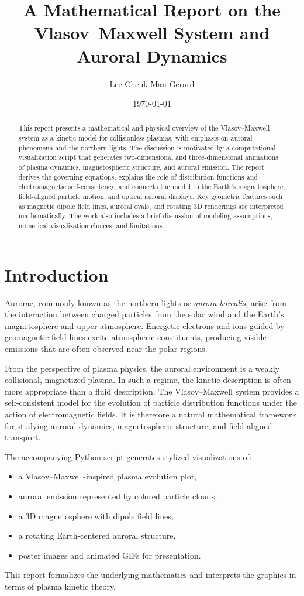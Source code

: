 \documentclass[11pt]{article}
\title{\textbf{A Mathematical Report on the Vlasov--Maxwell System and Auroral Dynamics}}
\author{Lee Cheuk Man Gerard}
\date{\today}
\begin{document}
\maketitle

\begin{abstract}
This report presents a mathematical and physical overview of the Vlasov--Maxwell system as a kinetic model for collisionless plasmas, with emphasis on auroral phenomena and the northern lights. The discussion is motivated by a computational visualization script that generates two-dimensional and three-dimensional animations of plasma dynamics, magnetospheric structure, and auroral emission. The report derives the governing equations, explains the role of distribution functions and electromagnetic self-consistency, and connects the model to the Earth's magnetosphere, field-aligned particle motion, and optical auroral displays. Key geometric features such as magnetic dipole field lines, auroral ovals, and rotating 3D renderings are interpreted mathematically. The work also includes a brief discussion of modeling assumptions, numerical visualization choices, and limitations.
\end{abstract}

\tableofcontents
\newpage

\section{Introduction}
Aurorae, commonly known as the northern lights or \emph{aurora borealis}, arise from the interaction between charged particles from the solar wind and the Earth's magnetosphere and upper atmosphere. Energetic electrons and ions guided by geomagnetic field lines excite atmospheric constituents, producing visible emissions that are often observed near the polar regions.

From the perspective of plasma physics, the auroral environment is a weakly collisional, magnetized plasma. In such a regime, the kinetic description is often more appropriate than a fluid description. The Vlasov--Maxwell system provides a self-consistent model for the evolution of particle distribution functions under the action of electromagnetic fields. It is therefore a natural mathematical framework for studying auroral dynamics, magnetospheric structure, and field-aligned transport.

The accompanying Python script generates stylized visualizations of:
\begin{itemize}
    \item a Vlasov--Maxwell-inspired plasma evolution plot,
    \item auroral emission represented by colored particle clouds,
    \item a 3D magnetosphere with dipole field lines,
    \item a rotating Earth-centered auroral structure,
    \item poster images and animated GIFs for presentation.
\end{itemize}
This report formalizes the underlying mathematics and interprets the graphics in terms of plasma kinetic theory.
\end{document}
